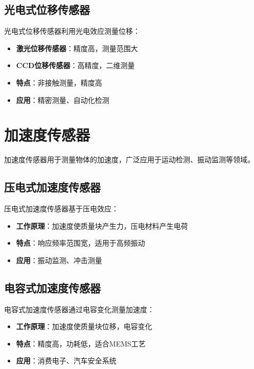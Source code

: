 \documentclass[12pt,UTF8]{ctexbook}
\begin{document}
\subsection{光电式位移传感器}

光电式位移传感器利用光电效应测量位移：

\begin{itemize}[leftmargin=2cm]
	\item \textbf{激光位移传感器}：精度高，测量范围大
	\item \textbf{CCD位移传感器}：高精度，二维测量
	\item \textbf{特点}：非接触测量，精度高
	\item \textbf{应用}：精密测量、自动化检测
\end{itemize}

\section{加速度传感器}

加速度传感器用于测量物体的加速度，广泛应用于运动检测、振动监测等领域。

\subsection{压电式加速度传感器}

压电式加速度传感器基于压电效应：

\begin{itemize}[leftmargin=2cm]
	\item \textbf{工作原理}：加速度使质量块产生力，压电材料产生电荷
	\item \textbf{特点}：响应频率范围宽，适用于高频振动
	\item \textbf{应用}：振动监测、冲击测量
\end{itemize}

\subsection{电容式加速度传感器}

电容式加速度传感器通过电容变化测量加速度：

\begin{itemize}[leftmargin=2cm]
	\item \textbf{工作原理}：加速度使质量块位移，电容变化
	\item \textbf{特点}：精度高，功耗低，适合MEMS工艺
	\item \textbf{应用}：消费电子、汽车安全系统
\end{itemize}
\end{document}
